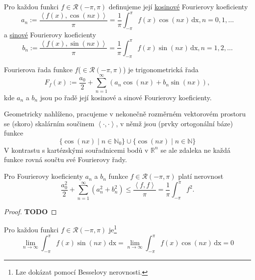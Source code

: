 \documentclass[../main.tex]{subfiles}
\begin{document}
\begin{definition}
    Pro každou funkci $f \in \mathcal{R}(-\pi,\pi)$ definujeme její
    \underline{kosinové} Fourierovy koeficienty
    \[ a_n := \frac{\left< f(x), \cos(nx) \right>}{\pi} = \frac{1}{\pi}\int_{-\pi}^{\pi}f(x)\cos(nx)\,\text{dx}, n = 0,1,\dots \]
    a \underline{sinové} Fourierovy koeficienty
    \[ b_n := \frac{\left< f(x), \sin(nx) \right>}{\pi} = \frac{1}{\pi}\int_{-\pi}^{\pi}f(x)\sin(nx)\,\text{dx}, n = 1,2,\dots \]
\end{definition}

\begin{definition}
    Fourierova řada funkce $f$($\in \mathcal{R}(-\pi,\pi)$) je trigonometrická řada
    \[ F_f(x) := \frac{a_0}{2} + \sum_{n=1}^{\infty} \left( a_n \cos(nx) + b_n \sin(nx) \right), \]
    kde $a_n$ a $b_n$ jsou po řadě její kosinové a sinové Fourierovy koeficienty.
\end{definition}

\noindent
Geometricky nahlíženo, pracujeme v nekonečně rozměrném vektorovém prostoru se (skoro) skalárním součinem $\left<\cdot,\cdot\right>$,
v němž jsou (prvky ortogonální báze) funkce
\[ \{ \cos(nx) \mid n\in \mathbb{N}_0 \} \cup \{ \cos(nx) \mid n\in \mathbb{N} \} \]
V kontrastu s kartézskými souřadnicemi bodů v $\mathbb{R}^n$ se ale zdaleka ne každá funkce rovná součtu
své Fourierovy řady.

\begin{theorem}
    Pro Fourierovy koeficienty $a_n$ a $b_n$ funkce $f \in \mathcal{R}(-\pi,\pi)$ platí nerovnost
    \[ \frac{a_0^2}{2} + \sum_{n=1}^{\infty}(a_n^2+b_n^2) \leq \frac{\left<f,f\right>}{\pi} = \frac{1}{\pi}\int_{-\pi}^{\pi}f^2. \]
\end{theorem}
\begin{proof}
    \LARGE
    \textbf{TODO}
\end{proof}

\begin{lemma}
    Pro každou funkci $f \in \mathcal{R}(-\pi,\pi)$ je\footnote{Lze dokázat pomocí Besselovy nerovnosti.}
    \[ \lim_{n\to\infty} \int_{-\pi}^{\pi}f(x)\sin(nx)\,\text{dx} = \lim_{n\to\infty} \int_{-\pi}^{\pi}f(x)\cos(nx)\,\text{dx} = 0 \]
\end{lemma}
\end{document}
